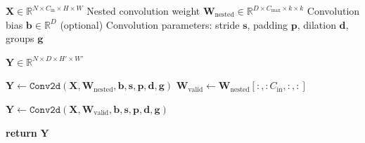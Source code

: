 \begin{algorithm}
\caption{Matryoshka Kernel Input Layer Forward Pass}
\label{alg:adaptive_input_conv_slice}
\begin{algorithmic}[1]

\REQUIRE
\INPUT $\mathbf{X} \in \mathbb{R}^{N \times C_{\text{in}} \times H \times W}$
\INPUT Nested convolution weight 
$\mathbf{W}_{\text{nested}} \in \mathbb{R}^{D \times C_{\text{max}} \times k \times k}$
\INPUT Convolution bias $\mathbf{b} \in \mathbb{R}^{D}$ (optional)
\INPUT Convolution parameters: stride $\mathbf{s}$, padding $\mathbf{p}$,
dilation $\mathbf{d}$, groups $\mathbf{g}$

\ENSURE
\OUTPUT $\mathbf{Y} \in \mathbb{R}^{N \times D \times H' \times W'}$


    \STATE $\mathbf{Y} \gets
    \texttt{Conv2d}(\mathbf{X}, \mathbf{W}_{\text{nested}}, \mathbf{b},
    \mathbf{s}, \mathbf{p}, \mathbf{d}, \mathbf{g})$
\ELSE
    \STATE $\mathbf{W}_{\text{valid}} \gets
    \mathbf{W}_{\text{nested}}[:, :C_{\text{in}}, :, :]$

    \STATE $\mathbf{Y} \gets
    \texttt{Conv2d}(\mathbf{X}, \mathbf{W}_{\text{valid}}, \mathbf{b},
    \mathbf{s}, \mathbf{p}, \mathbf{d}, \mathbf{g})$
\ENDIF

\STATE \textbf{return} $\mathbf{Y}$

\ENDFUNCTION

\end{algorithmic}
\end{algorithm}
